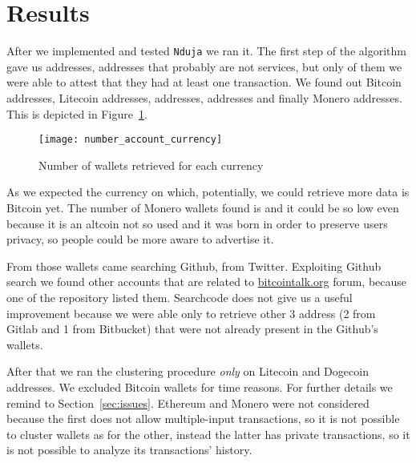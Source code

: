 \newcommand{\accountGitlab}{2}

\newcommand{\accountBitbucket}{1}


\section{Results} \label{results}
After we implemented and tested \texttt{Nduja} we ran it. The first step of the
algorithm gave us \startingNumberAllWallets{} addresses,
\startingNumberWalletsNotService{} addresses that probably are not services,
but only \startingNumberWalletsAtLeastOneTransaction{} of them we were able to
attest that they had at least one transaction. We found out \startingBTC{}
Bitcoin addresses, \startingLTC{} Litecoin addresses, \startingDOGE{}
addresses, \startingETH{} addresses and finally \startingXMR{} Monero
addresses. This is depicted in Figure~\ref{fig:numberaccountcurrency}.
\begin{figure}[H]
\centering
\texttt{[image: number\_account\_currency]}
\caption{Number of wallets retrieved for each currency}
\label{fig:numberaccountcurrency}
\end{figure}

As we expected the currency on which, potentially, we could retrieve more data is Bitcoin yet. The number of Monero wallets found is \startingXMR{} and it could be so low even because it is an altcoin not so used and it was born in order to preserve users privacy, so people could be more aware to advertise it.

From those wallets \accountGithub{} came searching Github, \accountTwitter{}
from Twitter. Exploiting Github search we found other \accountBitcointalk{}
accounts that are related to \url{bitcointalk.org} forum, because one of the
repository listed them. Searchcode does not give us a useful improvement
because we were able only to retrieve other 3 address (\accountGitlab{} from
Gitlab and \accountBitbucket{} from Bitbucket) that were not already present in
the Github's wallets. 

After that we ran the clustering procedure \emph{only} on Litecoin and Dogecoin
addresses. We excluded Bitcoin wallets for time reasons. For further details we
remind to Section~\ref{sec:issues}. Ethereum and Monero were not considered
because the first does not allow multiple-input transactions, so it is not
possible to cluster wallets as for the other, instead the latter has private
transactions, so it is not possible to analyze its transactions' history. 

